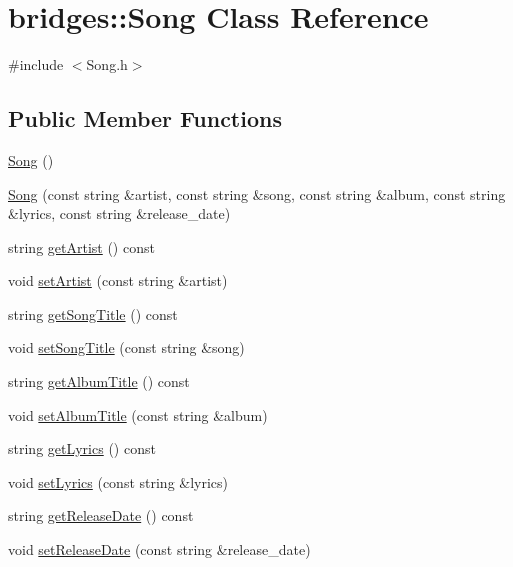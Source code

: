 \hypertarget{classbridges_1_1_song}{}\section{bridges\+:\+:Song Class Reference}
\label{classbridges_1_1_song}


{\ttfamily \#include $<$Song.\+h$>$}

\subsection*{Public Member Functions}
\begin{DoxyCompactItemize}
\item 
\mbox{\hyperlink{classbridges_1_1_song_aa938ae0bd6d566d6e2a6bf30beeb0ea5}{Song}} ()
\item 
\mbox{\hyperlink{classbridges_1_1_song_a6bba7d1a1ce20a34b30cfa1cd874faa0}{Song}} (const string \&artist, const string \&song, const string \&album, const string \&lyrics, const string \&release\+\_\+date)
\item 
string \mbox{\hyperlink{classbridges_1_1_song_a22175397f3ca65470d4c7081a3d37a13}{get\+Artist}} () const
\item 
void \mbox{\hyperlink{classbridges_1_1_song_a21569a1b94eced89eed1a2ab8b2ff1ca}{set\+Artist}} (const string \&artist)
\item 
string \mbox{\hyperlink{classbridges_1_1_song_a28eee6f38acce73615a4ff6317a435d4}{get\+Song\+Title}} () const
\item 
void \mbox{\hyperlink{classbridges_1_1_song_a18e3a6bd5f424a6dadf529bed446a0d0}{set\+Song\+Title}} (const string \&song)
\item 
string \mbox{\hyperlink{classbridges_1_1_song_a1e85190c97eb8d2f9ce37dfbdb9f399b}{get\+Album\+Title}} () const
\item 
void \mbox{\hyperlink{classbridges_1_1_song_af89d78b799b672282a60c337327d9988}{set\+Album\+Title}} (const string \&album)
\item 
string \mbox{\hyperlink{classbridges_1_1_song_a54a6ce44a8b553527ba7cb0f8521fb7f}{get\+Lyrics}} () const
\item 
void \mbox{\hyperlink{classbridges_1_1_song_af32f02057c6dd253ea4e8d002e548cf2}{set\+Lyrics}} (const string \&lyrics)
\item 
string \mbox{\hyperlink{classbridges_1_1_song_a0504614f584d42624888caf74cf45060}{get\+Release\+Date}} () const
\item 
void \mbox{\hyperlink{classbridges_1_1_song_a492a14035331c66652488c4f222aa7b3}{set\+Release\+Date}} (const string \&release\+\_\+date)
\end{DoxyCompactItemize}


